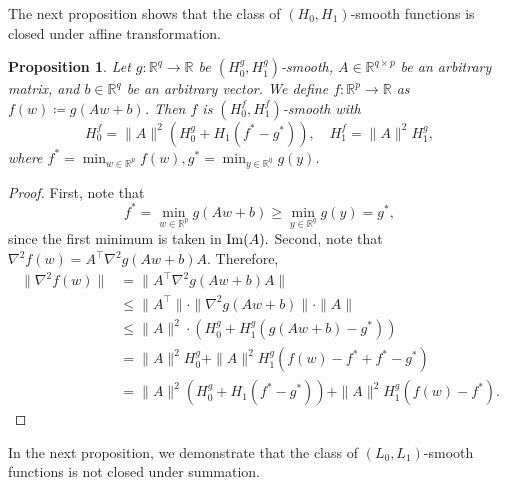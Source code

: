 \documentclass[a4paper,11pt]{article}
\newcommand{\R}{\mathbb{R}}
\newcommand{\1}{\mathbbm{1}}
\newcommand{\eqdef}{\coloneqq}
\theoremstyle{plain}
\newtheorem{proposition}[theorem]{Proposition}
\begin{document}
The next proposition shows that the class of $(H_0,H_1)$-smooth functions is closed under affine transformation.
\begin{proposition}
    Let $g\colon\R^{q}\to\R$ be $(H_0^g,H_1^g)$-smooth, $A\in\R^{q\times p}$ be an arbitrary matrix, and $b\in\R^q$ be an arbitrary vector. We define $f\colon\R^p\to\R$ as $f(w) \eqdef g(Aw+b)$. Then $f$ is $(H_0^f,H_1^f)$-smooth with 
    \[
    H_0^f =  \|A\|^2(H_0^g + H_1(f^*-g^*)),\quad H_1^f =  \|A\|^2H_1^g,
    \]
    where $f^* = \min_{w\in\R^p}f(w), g^*=\min_{y\in\R^q}g(y).$
\end{proposition}
\begin{proof}
    First, note that
    \[
    f^* = \min_{w\in\R^p} g(Aw+b) \ge \min_{y\in\R^q} g(y) = g^*,
    \]
    since the first minimum is taken in ${\rm Im}(A).$ Second, note that $\nabla^2f(w) = A^\top \nabla^2g(Aw+b)A.$ Therefore, 
    \begin{align*}
        \|\nabla^2f(w)\| &= \|A^\top\nabla^2g(Aw+b)A\|\\
        &\le \|A^\top\|\cdot \|\nabla^2g(Aw+b)\|\cdot \|A\|\\
        &\le \|A\|^2 \cdot (H_0^g + H_1^g(g(Aw+b)-g^*))\\
        &= \|A\|^2H_0^g + \|A\|^2H_1^g(f(w)-f^* + f^* - g^*)\\
        &= \|A\|^2(H_0^g + H_1(f^*-g^*)) + \|A\|^2H_1^g(f(w)-f^*).
    \end{align*}
\end{proof}

In the next proposition, we demonstrate that the class of $(L_0,L_1)$-smooth functions is not closed under summation.
\end{document}
